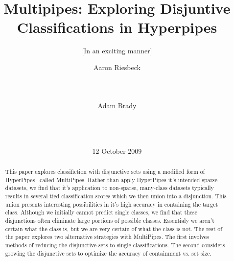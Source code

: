 \documentclass{acm_proc_article-sp}
\begin{document}
\title{Multipipes: Exploring Disjuntive Classifications in Hyperpipes}
\subtitle{[In an exciting manner]
}

%
\author{
%
\alignauthor
Aaron Riesbeck\\
       \\
       \\
       \\
\alignauthor
Adam Brady\\
       \\
       \\
       \\
}
\date{12 October 2009}

\maketitle
\begin{abstract}

This paper explores classifiction with disjunctive sets using a modified form of HyperPipes~\cite{Eisenstein04} called MultiPipes. Rather than apply HyperPipes it's intended sparse datasets, we find that it's application to non-sparse, many-class datasets typically results in several tied classification scores which we then union into a disjunction. This union presents interesting possibilities in it's high accuracy in containing the target class. Although we initially cannot predict single classes, we find that these disjunctions often eliminate large portions of possible classes. Essentialy we aren't certain what the class is, but we are very certain of what the class is not. The rest of the paper explores two alternative strategies with MultiPipes. The first involves methods of reducing the disjunctive sets to single classifications. The second considers growing the disjunctive sets to optimize the accuracy of containment vs. set size.

\end{abstract}
\end{document}
